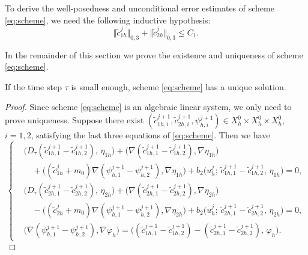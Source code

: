 To derive the well-posedness and unconditional error estimates of scheme
\eqref{eq:scheme}, we need the following inductive hypothesis:
\begin{equation}
  \bigl\Vert\tilde{c}^{j}_{1h}\bigr\Vert_{0,3}
  + \bigl\Vert\tilde{c}^{j}_{2h}\bigr\Vert_{0,3}
  \le C_{1}.
  \label{eq:inductive}
\end{equation}

In the remainder of this section we prove the existence and uniqueness of
scheme \eqref{eq:scheme}.

\begin{theorem}
  \label{thm:wellposed}
  If the time step $\tau$ is small enough, scheme \eqref{eq:scheme} has a
  unique solution.
\end{theorem}

\begin{proof}
Since scheme \eqref{eq:scheme} is an algebraic linear system, we only need
to prove uniqueness. Suppose there exist
$(\tilde{c}^{j+1}_{1h,i},\tilde{c}^{j+1}_{2h,i},\psi^{j+1}_{h,i})
\in X^{0}_{h}\times X^{0}_{h}\times X^{0}_{h}$, $i=1,2$, satisfying the
last three equations of \eqref{eq:scheme}. Then we have
\begin{equation}
  \left\{
  \begin{aligned}
    &\bigl(D_{\tau}(\tilde{c}^{j+1}_{1h,1}-\tilde{c}^{j+1}_{1h,2}),\,\eta_{1h}\bigr)
     + \bigl(\nabla(\tilde{c}^{j+1}_{1h,1}-\tilde{c}^{j+1}_{1h,2}),\nabla\eta_{1h}\bigr)\\
    &\quad
     + \bigl((\tilde{c}^{j}_{1h}+m_{0})
       \nabla(\psi^{j+1}_{h,1}-\psi^{j+1}_{h,2}),\nabla\eta_{1h}\bigr)
     + b_{2}\bigl(u^{j}_{h};\,
       \tilde{c}^{j+1}_{1h,1}-\tilde{c}^{j+1}_{1h,2},\,\eta_{1h}\bigr) = 0,\\[4pt]
    &\bigl(D_{\tau}(\tilde{c}^{j+1}_{2h,1}-\tilde{c}^{j+1}_{2h,2}),\,\eta_{2h}\bigr)
     + \bigl(\nabla(\tilde{c}^{j+1}_{2h,1}-\tilde{c}^{j+1}_{2h,2}),\nabla\eta_{2h}\bigr)\\
    &\quad
     - \bigl((\tilde{c}^{j}_{2h}+m_{0})
       \nabla(\psi^{j+1}_{h,1}-\psi^{j+1}_{h,2}),\nabla\eta_{2h}\bigr)
     + b_{2}\bigl(u^{j}_{h};\,
       \tilde{c}^{j+1}_{2h,1}-\tilde{c}^{j+1}_{2h,2},\,\eta_{2h}\bigr) = 0,\\[4pt]
    &\bigl(\nabla(\psi^{j+1}_{h,1}-\psi^{j+1}_{h,2}),\nabla\varphi_{h}\bigr)
     = \bigl((\tilde{c}^{j+1}_{1h,1}-\tilde{c}^{j+1}_{1h,2})
       - (\tilde{c}^{j+1}_{2h,1}-\tilde{c}^{j+1}_{2h,2}),\,\varphi_{h}\bigr).
  \end{aligned}
  \right.
  \label{eq:diff-system}
\end{equation}


\end{proof}
